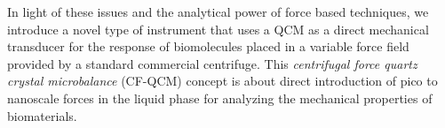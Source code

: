 In light of these issues and the analytical power of force based
techniques, we introduce a novel type of instrument that uses a QCM as a
direct mechanical transducer for the response of biomolecules placed in a
variable force field provided by a standard commercial centrifuge. This
\textit{centrifugal force quartz crystal microbalance} (CF-QCM) concept is
about direct introduction of pico to nanoscale forces in the liquid phase
for analyzing the mechanical properties of biomaterials.
